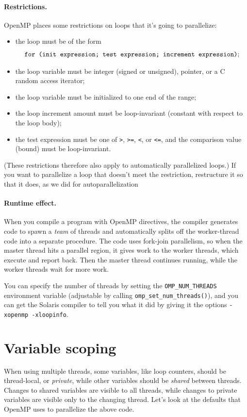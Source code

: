 \documentclass[a4paper]{report}
\newcommand{\CPP}{C\nolinebreak\hspace{-.05em}\raisebox{.4ex}{\tiny\bf +}\nolinebreak\hspace{-.10em}\raisebox{.4ex}{\tiny\bf +}}
\def\CPP{{C\nolinebreak[4]\hspace{-.05em}\raisebox{.4ex}{\tiny\bf ++}}}
\begin{document}
\paragraph{Restrictions.} OpenMP places some restrictions on
loops that it's going to parallelize:
\begin{itemize}
\item the loop must be of the form 
\[ \mbox{\tt for (init expression; test expression; increment expression)}; \]
\item the loop variable must be integer (signed or unsigned), pointer, or a \CPP~ 
random access iterator;
\item the loop variable must be initialized to one end of the range;
\item the loop increment amount must be loop-invariant (constant with respect to the loop body); 
\item the test expression must be one of {\tt >}, {\tt >=}, {\tt <}, or {\tt <=}, and the comparison value (bound) must be loop-invariant.
\end{itemize}

(These restrictions therefore also apply to automatically parallelized
loops.) If you want to parallelize a loop that doesn't meet the 
restriction, restructure it so that it does, as we  did for autoparallelization

\paragraph{Runtime effect.} When you compile a program with 
OpenMP directives, the compiler generates code to spawn a \emph{team}
of threads and automatically splits off the worker-thread code into a
separate procedure. The code uses fork-join parallelism, so when the
master thread hits a parallel region, it gives work to the worker
threads, which execute and report back. Then the master thread
continues running, while the worker threads wait for more work.

You can specify the number of threads by setting the
\verb+OMP_NUM_THREADS+ environment variable (adjustable by calling 
\verb+omp_set_num_threads()+), and you can get the
Solaris compiler to tell you what it did by giving it the
options \verb+-xopenmp -xloopinfo+.

\section*{Variable scoping}
When using multiple threads, some variables, like loop counters,
should be thread-local, or \emph{private}, while other variables
should be \emph{shared} between threads. Changes to shared variables
are visible to all threads, while changes to private variables are
visible only to the changing thread. Let's look at the defaults that
OpenMP uses to parallelize the above code.
\end{document}
